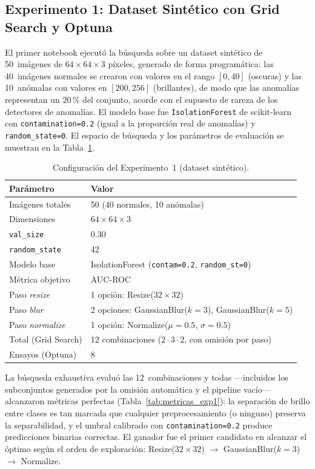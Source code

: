 \documentclass[conference,spanish]{IEEEtran}
\begin{document}
\subsection{Experimento 1: Dataset Sintético con Grid Search y Optuna}

El primer notebook ejecutó la búsqueda sobre un
dataset sintético de 50~imágenes de $64\times64\times3$ píxeles, generado
de forma programática: las 40~imágenes normales se crearon con valores en
el rango $[0, 40]$ (oscuras) y las 10~anómalas con valores en $[200, 256]$
(brillantes), de modo que las anomalías representan un 20\,\% del conjunto,
acorde con el supuesto de rareza de los detectores de anomalías. El modelo
base fue \texttt{IsolationForest} de
scikit-learn~\cite{pedregosa2011sklearn} con \texttt{contamination=0.2}
(igual a la proporción real de anomalías) y \texttt{random\_state=0}. El
espacio de búsqueda y los parámetros de evaluación se muestran en la
Tabla~\ref{tab:espacio_exp1}.

\begin{table}[t]
\centering
\renewcommand{\arraystretch}{1.2}
\caption{Configuración del Experimento~1 (dataset sintético).}
\label{tab:espacio_exp1}
\begin{tabular}{@{}ll@{}}
\toprule
\textbf{Parámetro} & \textbf{Valor} \\
\midrule
Imágenes totales    & 50 (40 normales, 10 anómalas) \\
Dimensiones         & $64\times64\times3$ \\
\texttt{val\_size}  & 0.30 \\
\texttt{random\_state} & 42 \\
Modelo base         & IsolationForest (\texttt{contam=0.2}, \texttt{random\_st=0}) \\
Métrica objetivo    & AUC-ROC \\
Paso \emph{resize}  & 1 opción: Resize($32\times32$) \\
Paso \emph{blur}    & 2 opciones: GaussianBlur($k=3$), GaussianBlur($k=5$) \\
Paso \emph{normalize} & 1 opción: Normalize($\mu=0.5$, $\sigma=0.5$) \\
Total (Grid Search) & 12 combinaciones ($2\cdot3\cdot2$, con omisión por paso) \\
Ensayos (Optuna)    & 8 \\
\bottomrule
\end{tabular}
\end{table}

La búsqueda exhaustiva evaluó las 12~combinaciones y todas —incluidos los
subconjuntos generados por la omisión automática y el pipeline vacío—
alcanzaron métricas perfectas (Tabla~\ref{tab:metricas_exp1}): la
separación de brillo entre clases es tan marcada que cualquier
preprocesamiento (o ninguno) preserva la separabilidad, y el umbral
calibrado con \texttt{contamination=0.2} produce predicciones binarias
correctas. El ganador fue el primer candidato en alcanzar el óptimo según
el orden de exploración: Resize($32\times32$) $\to$
GaussianBlur($k=3$) $\to$ Normalize.
\end{document}
